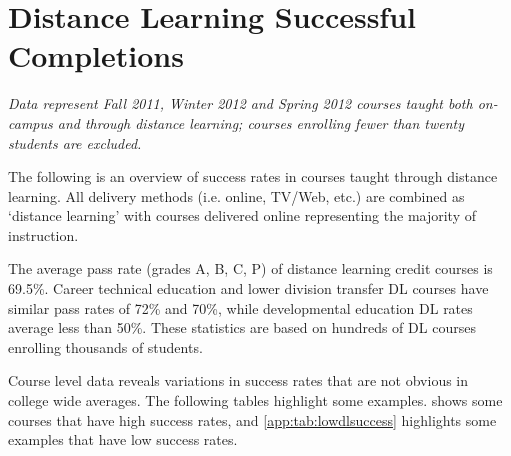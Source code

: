 \chapter{Distance Learning Successful Completions}\label{app:sec:dlsuccess}

\emph{Data represent Fall 2011, Winter 2012 and Spring 2012 courses taught both on-campus and through distance learning; courses enrolling fewer than twenty students are excluded.}

The following is an overview of success rates in courses taught through distance learning.  All delivery methods (i.e. online, TV/Web, etc.) are combined as `distance learning' with courses delivered online representing the majority of instruction.

The average pass rate (grades A, B, C, P) of distance learning credit courses is 69.5\%.  Career technical education and lower division transfer DL courses have similar pass rates of 72\% and 70\%, while developmental education DL rates average less than 50\%.
These statistics are based on hundreds of DL courses enrolling thousands of students.  

Course level data reveals variations in success rates that are not obvious in college wide averages.  The following tables highlight some examples.
 shows some courses that have high success rates, and 
\cref{app:tab:lowdlsuccess} highlights some examples that have low success rates.

